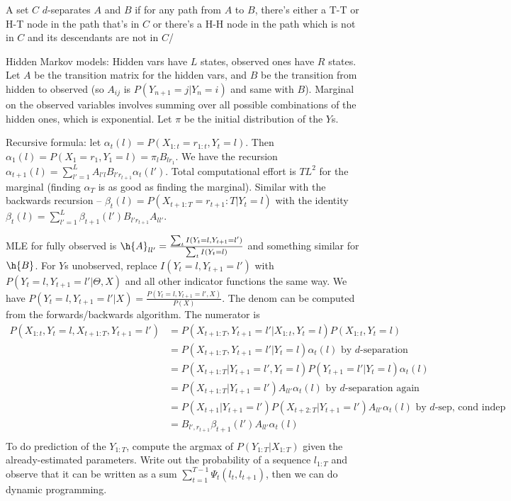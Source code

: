 \documentclass{article}
\begin{document}
A set $C$ $d$-separates $A$ and $B$ if for any path from $A$ to $B$, there's either a T-T or H-T node in the path that's in $C$ or there's a H-H node in the path which is not in $C$ and its descendants are not in $C$/

Hidden Markov models: Hidden vars have $L$ states, observed ones have $R$ states. Let $A$ be the transition matrix for the hidden vars, and $B$ be the transition from hidden to observed (so $A_{ij}$ is $P(Y_{n+1}=j|Y_n=i)$ and same with $B$). Marginal on the observed variables involves summing over all possible combinations of the hidden ones, which is exponential. Let $\pi$ be the initial distribution of the $Y$s.

Recursive formula: let $\alpha_t(l)=P(X_{1:t}=r_{1:t}, Y_t=l)$. Then $\alpha_1(l)=P(X_1=r_1,Y_1=l)=\pi_lB_{lr_1}$. We have the recursion $\alpha_{t+1}(l)=\sum_{l'=1}^LA_{l'l}B_{l'r_{t+1}}\alpha_t(l')$. Total computational effort is $TL^2$ for the marginal (finding $\alpha_T$ is as good as finding the marginal). Similar with the backwards recursion -- $\beta_t(l)=P(X_{t+1:T}=r_{t+1}:T|Y_t=l)$ with the identity $\beta_t(l)=\sum_{l'=1}^L\beta_{t+1}(l')B_{l'r_{t+1}}A_{ll'}$. 

MLE for fully observed is $\h{A}_{ll'}=\frac{\sum_tI(Y_t=l,Y_{t+1}=l')}{\sum_tI(Y_t=l)}$ and something similar for $\h{B}$. For $Y$s unobserved, replace $I(Y_t=l,Y_{t+1}=l')$ with $P(Y_t=l,Y_{t+1}=l'|\Theta,X)$ and all other indicator functions the same way. We have $P(Y_t=l,Y_{t+1}=l'|X)=\frac{P(Y_t=l,Y_{t+1}=l',X)}{P(X)}$. The denom can be computed from the forwards/backwards algorithm. The numerator is 
\begin{align*}
    P(X_{1:t},Y_t=l,X_{t+1:T},Y_{t+1}=l')&=P(X_{t+1:T},Y_{t+1}=l'|X_{1:t},Y_t=l)P(X_{1:t},Y_t=l)\\
                                         &=P(X_{t+1:T},Y_{t+1}=l'|Y_t=l)\alpha_t(l)\text{ by $d$-separation}\\
                                         &=P(X_{t+1:T}|Y_{t+1}=l',Y_t=l)P(Y_{t+1}=l'|Y_t=l)\alpha_t(l)\\
                                         &=P(X_{t+1:T}|Y_{t+1}=l')A_{ll'}\alpha_t(l)\text{ by $d$-separation again}\\
                                         &=P(X_{t+1}|Y_{t+1}=l')P(X_{t+2:T}|Y_{t+1}=l')A_{ll'}\alpha_t(l)\text{ by $d$-sep, cond indep}\\
                                         &=B_{l',r_{t+1}}\beta_{t+1}(l')A_{ll'}\alpha_t(l)\\
\end{align*}
To do prediction of the $Y_{1:T}$, compute the argmax of $P(Y_{1:T}|X_{1:T})$ given the already-estimated parameters. Write out the probability of a sequence $l_{1:T}$ and observe that it can be written as a sum $\sum_{t=1}^{T-1}\Psi_t(l_t,l_{t+1})$, then we can do dynamic programming.
\end{document}

